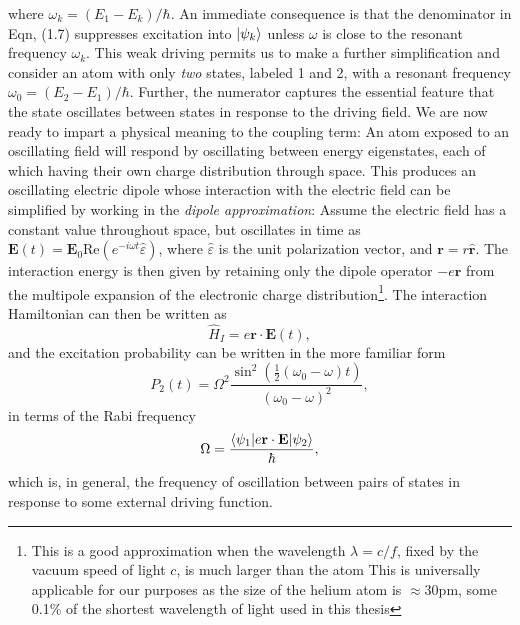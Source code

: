 	where $\omega_k = (E_1-E_k)/\hbar$. An immediate consequence is that the denominator in Eqn, (1.7) suppresses excitation into $|\psi_k\rangle$ unless $\omega$ is close to the resonant frequency $\omega_k$. This weak driving permits us to make a further simplification and consider an atom with only \emph{two} states, labeled 1 and 2, with a resonant frequency $\omega_0 =(E_2-E_1)/\hbar$. Further, the numerator captures the essential feature that the state oscillates between states in response to the driving field. We are now ready to impart a physical meaning to the coupling term: An atom exposed to an oscillating field will respond by oscillating between energy eigenstates, each of which having their own charge distribution through space. This produces an oscillating electric dipole whose interaction with the electric field can be simplified by working in the \emph{dipole approximation}: Assume the electric field has a constant value throughout space, but oscillates in time as $\textbf{E}(t) = \textbf{E}_0 \textrm{Re}(e^{-i\omega t}\hat{\varepsilon})$, where $\hat{\varepsilon}$ is the unit polarization vector, and $\textbf{r} = r\hat{\textbf{r}}$. The interaction energy is then given by retaining only the dipole operator $-e\textbf{r}$ from the multipole expansion of the electronic charge distribution\footnote{This is a good approximation when the wavelength $\lambda = c/f$, fixed by the vacuum speed of light $c$, is much larger than the atom This is universally applicable for our purposes as the size of the helium atom is $\approx 30$pm, some 0.1\% of the shortest wavelength of light used in this thesis}. The interaction Hamiltonian can then be written as
	\begin{equation}
		\hat{H}_I = e\textbf{r}\cdot\textbf{E}(t),
	\end{equation}
	and the excitation probability can be written in the more familiar form \cite{FootAtomic,BinneyBook}
	\begin{equation}
		P_2(t) = \Omega^2 \frac{\sin^2(\frac{1}{2}(\omega_0-\omega)t)}{(\omega_0-\omega)^2},
		\label{eqn:transition_prob}
	\end{equation}
	in terms of the Rabi frequency
	\begin{equation}
		\Omega = \frac{\langle\psi_1|e\textbf{r}\cdot\textbf{E}|\psi_2\rangle}{\hbar},
	\end{equation}
	which is, in general, the frequency of oscillation between pairs of states in response to some external driving function.


